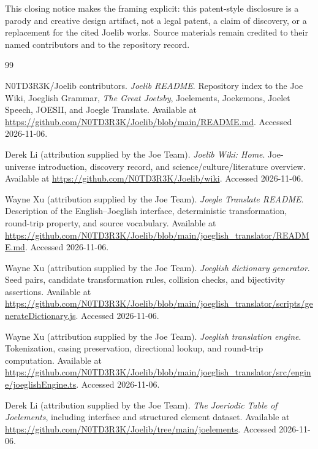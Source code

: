 \documentclass[12pt]{article}
\begin{document}
This closing notice makes the framing explicit: this patent-style disclosure is a parody and creative design artifact, not a legal patent, a claim of discovery, or a replacement for the cited Joelib works. Source materials remain credited to their named contributors and to the repository record.

\clearpage
\begin{thebibliography}{99}

N0TD3R3K/Joelib contributors. \emph{Joelib README}. Repository index to the Joe Wiki, Joeglish Grammar, \emph{The Great Joetsby}, Joelements, Joekemons, Joelet Speech, JOESII, and Joegle Translate. Available at \url{https://github.com/N0TD3R3K/Joelib/blob/main/README.md}. Accessed 2026-11-06.

Derek Li (attribution supplied by the Joe Team). \emph{Joelib Wiki: Home}. Joe-universe introduction, discovery record, and science/culture/literature overview. Available at \url{https://github.com/N0TD3R3K/Joelib/wiki}. Accessed 2026-11-06.

Wayne Xu (attribution supplied by the Joe Team). \emph{Joegle Translate README}. Description of the English--Joeglish interface, deterministic transformation, round-trip property, and source vocabulary. Available at \url{https://github.com/N0TD3R3K/Joelib/blob/main/joeglish_translator/README.md}. Accessed 2026-11-06.

Wayne Xu (attribution supplied by the Joe Team). \emph{Joeglish dictionary generator}. Seed pairs, candidate transformation rules, collision checks, and bijectivity assertions. Available at \url{https://github.com/N0TD3R3K/Joelib/blob/main/joeglish_translator/scripts/generateDictionary.js}. Accessed 2026-11-06.

Wayne Xu (attribution supplied by the Joe Team). \emph{Joeglish translation engine}. Tokenization, casing preservation, directional lookup, and round-trip computation. Available at \url{https://github.com/N0TD3R3K/Joelib/blob/main/joeglish_translator/src/engine/joeglishEngine.ts}. Accessed 2026-11-06.

Derek Li (attribution supplied by the Joe Team). \emph{The Joeriodic Table of Joelements}, including interface and structured element dataset. Available at \url{https://github.com/N0TD3R3K/Joelib/tree/main/joelements}. Accessed 2026-11-06.


\end{thebibliography}
\end{document}
